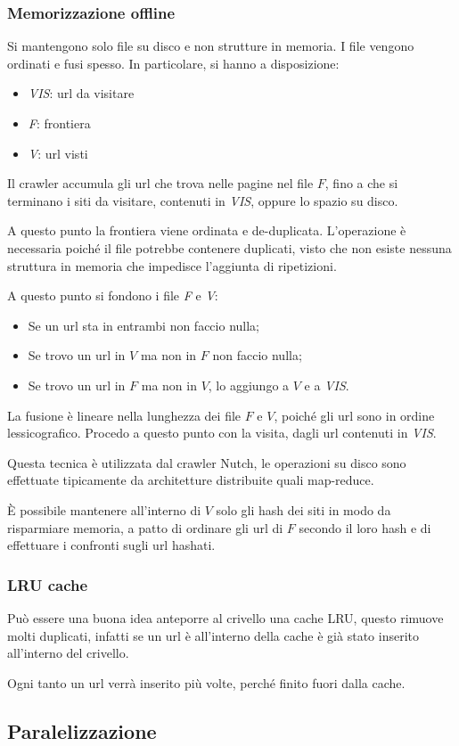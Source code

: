 \subsubsection{Memorizzazione offline} 
Si mantengono solo file su disco e non strutture in memoria. 
I file vengono ordinati e fusi spesso. In particolare, si hanno a disposizione: 
\begin{itemize}
    \item \emph{VIS}: url da visitare
    \item \emph{F}: frontiera
    \item \emph{V}: url visti
\end{itemize}
Il crawler accumula gli url che trova nelle pagine nel file $F$, 
fino a che si terminano i siti da visitare, contenuti 
in \emph{VIS}, oppure lo spazio su disco.

A questo punto la frontiera viene ordinata e de-duplicata. 
L'operazione è necessaria poiché il file potrebbe contenere duplicati, 
visto che non esiste nessuna struttura 
in memoria che impedisce l'aggiunta di ripetizioni.

A questo punto si fondono i file \emph{F} e \emph{V}: 
\begin{itemize}
    \item Se un url sta in entrambi non faccio nulla;
    \item Se trovo un url in $V$ ma non in $F$ non faccio nulla;
    \item Se trovo un url in $F$ ma non in $V$, lo aggiungo a $V$ e 
    a \emph{VIS}.
\end{itemize}
La fusione è lineare nella lunghezza dei file $F$ e $V$, poiché gli url sono in ordine lessicografico.
Procedo a questo punto con la visita, dagli url contenuti in \emph{VIS}.
\begin{remark}
    Questa tecnica è utilizzata dal crawler Nutch, le operazioni su disco 
    sono effettuate tipicamente da architetture distribuite quali map-reduce.
\end{remark}
\begin{remark}
    È possibile mantenere all'interno di $V$ solo gli hash dei siti 
    in modo da risparmiare memoria, a patto di ordinare gli url di $F$ secondo il 
    loro hash e di effettuare i confronti sugli url hashati.
\end{remark}

\subsubsection{LRU cache}
Può essere una buona idea anteporre al crivello una cache LRU, questo rimuove 
molti duplicati, infatti se un url è all'interno della cache è già stato inserito 
all'interno del crivello. 

Ogni tanto un url verrà inserito più volte, perché finito fuori dalla cache.

\subsection{Paralelizzazione}